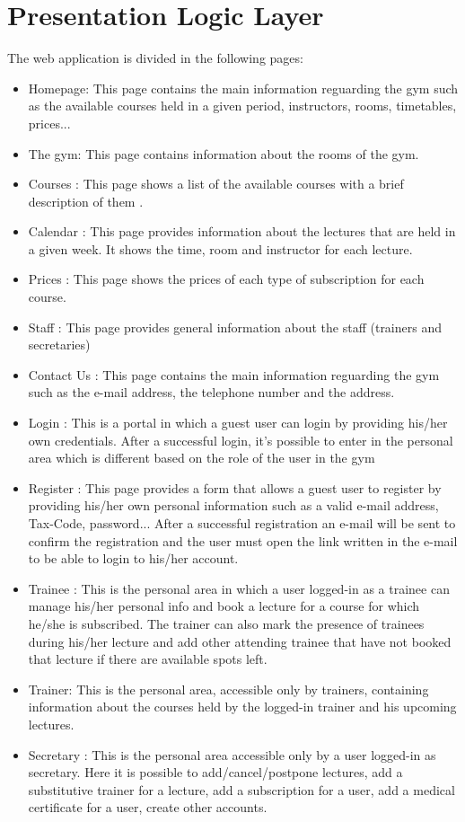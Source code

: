 \section{Presentation Logic Layer}


The web application is divided in the following pages:
\begin{itemize}
	\item Homepage: This page contains the main information reguarding the gym such as the available courses held in a given period, instructors, rooms, timetables, prices...
	\item The gym: This page contains information about the rooms of the gym.
	\item Courses : This page shows a list of the available courses with a brief description of them .
	\item Calendar : This page provides information about the lectures that are held in a given week. It shows the time, room and instructor for each lecture.
	\item Prices : This page shows the prices of each type of subscription for each course.
	\item Staff : This page provides general information about the staff (trainers and secretaries)
	\item Contact Us : This page contains the main information reguarding the gym such as the e-mail address, the telephone number and the address.
	\item Login : This is a portal in which a guest user can login by providing his/her own credentials. After a successful login, it's possible to enter in the personal area which is different based on the role of the user in the gym
	\item Register : This page provides a form that allows a guest user to register by providing his/her own personal information such as a valid e-mail address, Tax-Code, password... After a successful registration an e-mail will be sent to confirm the registration and the user must open the link written in the e-mail to be able to login to his/her account.
	\item Trainee : This is the personal area in which a user logged-in as a trainee can manage his/her personal info and book a lecture for a course for which he/she is subscribed. The trainer can also mark the presence of trainees during his/her lecture and add other attending trainee that have not booked that lecture if there are available spots left.
	\item Trainer: This  is the personal area, accessible only by trainers, containing information about the courses held by the logged-in trainer and his upcoming lectures.
	\item Secretary : This is the personal area accessible only by a user logged-in as secretary. Here it is possible to add/cancel/postpone lectures, add a substitutive trainer for a lecture, add a subscription for a user, add a medical certificate for a user, create other accounts.
\end{itemize}

